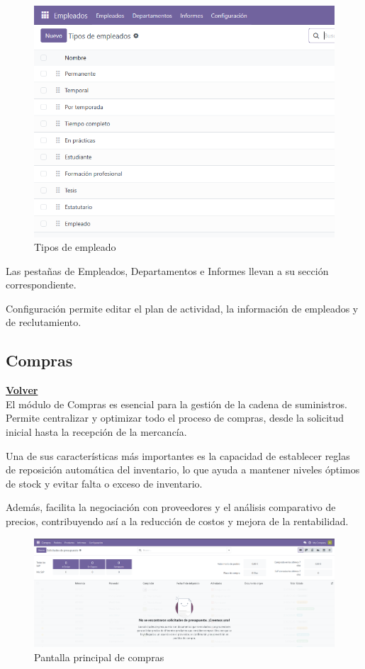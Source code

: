 \documentclass[a4paper,12pt]{article}
\begin{document}
\begin{figure}[h!]
    \centering
    \includegraphics[width=1\textwidth]{pr2odoo26-tiposEmpleado.png}
    \caption{Tipos de empleado}
\end{figure}
\FloatBarrier

Las pestañas de Empleados, Departamentos e Informes llevan a su sección correspondiente.

Configuración permite editar el plan de actividad, la información de empleados y de reclutamiento.

\clearpage

\subsection{Compras}
\hyperlink{anchor-indice}{\textbf{Volver}}\\

El módulo de Compras es esencial para la gestión de la cadena de suministros. Permite centralizar y optimizar todo el proceso de compras, desde la solicitud inicial hasta la recepción de la mercancía.

Una de sus características más importantes es la capacidad de establecer reglas de reposición automática del inventario, lo que ayuda a mantener niveles óptimos de stock y evitar falta o exceso de inventario.

Además, facilita la negociación con proveedores y el análisis comparativo de precios, contribuyendo así a la reducción de costos y mejora de la rentabilidad.

\begin{figure}[h!]
    \centering
    \includegraphics[width=1\textwidth]{pr2odoo27-pantallaPrincipalCompras.png}
    \caption{Pantalla principal de compras}
\end{figure}
\FloatBarrier
\end{document}
